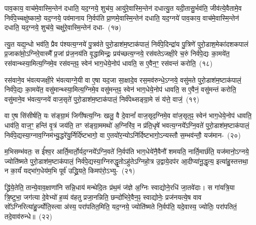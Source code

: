 पाव॒काय॒ वाच॑मे॒वास्मि॒न्तेन॑ दधाति॒ यद॒ग्नये॒ शुच॑य॒ आयु॑रे॒वास्मि॒न्तेन॑ दधात्यु॒त यदी॒तासु॒र्भव॑ति॒ जीव॑त्ये॒वैतामे॒व निर्व॑पे॒च्चक्षु॑ष्कामो॒ यद॒ग्नये॒ पव॑मानाय नि॒र्वप॑ति प्रा॒णमे॒वा\-स्मि॒न्तेन॑ दधाति॒ यद॒ग्नये॑ पाव॒काय॒ वाच॑मे॒वास्मि॒न्तेन॑ दधाति॒ यद॒ग्नये॒ शुच॑ये॒ चक्षु॑रे॒वास्मि॒न्तेन॑ दधा-~(१७)\ip

त्यु॒त यद्य॒न्धो भव॑ति॒ प्रैव प॑श्यत्य॒ग्नये॑ पु॒त्रव॑ते पुरो॒डाश॑\-म॒ष्टा\-क॑पालं॒ निर्व॑पे॒दिन्द्रा॑य पु॒त्रिणे॑ पुरो॒डाश॒मेका॑\-दश\-कपालं प्र॒जाका॑मो़॒\-ऽग्निरे॒वास्मै᳚ प्र॒जां प्र॑ज॒नय॑ति वृ॒द्धामिन्द्रः॒ प्रय॑च्छत्य॒ग्नये॒ रस॑वते\-ऽजक्षी॒रे च॒रुं निर्व॑पे॒द्यः का॒मये॑त॒ रस॑वान्थ्स्या॒मित्य॒ग्निमे॒व रस॑वन्त॒ꣴ॒ स्वेन॑ भाग॒धेये॒नोप॑ धावति॒ स ए॒वैन॒ꣳ॒ रस॑वन्तं करोति॒~(१८)\ip

रस॑वाने॒व भ॑वत्यजक्षी॒रे भ॑वत्याग्ने॒यी वा ए॒षा यद॒जा सा॒क्षादे॒व रस॒मव॑\-रुन्धे॒\-ऽग्नये॒ वसु॑मते पुरो॒डाश॑\-म॒ष्टा\-क॑पालं॒ निर्व॑पे॒द्यः का॒मये॑त॒ वसु॑मान्थ्स्या॒मित्य॒ग्निमे॒व वसु॑मन्त॒ꣴ॒ स्वेन॑ भाग॒धेये॒नोप॑ धावति॒ स ए॒वैनं॒ वसु॑मन्तं करोति॒ वसु॑माने॒व भ॑वत्य॒ग्नये॑ वाज॒सृते॑ पुरो॒डाश॑\-म॒ष्टा\-क॑पालं॒ निर्व॑पेथ्सङ्ग्रा॒मे सं य॑त्ते॒ वाजं॒~(१९)\ip

वा ए॒ष सि॑सीर्\mbox{}षति॒ यः स॑ङ्ग्रा॒मं जिगी॑षत्य॒ग्निः खलु॒ वै दे॒वानां᳚ वाज॒सृद॒ग्निमे॒व वा॑ज॒सृत॒ꣴ॒ स्वेन॑ भाग॒धेये॒नोप॑ धावति॒ धाव॑ति॒ वाज॒ꣳ॒ हन्ति॑ वृ॒त्रं जय॑ति॒ तꣳ स॑ङ्ग्रा॒ममथो॑ अ॒ग्निरि॑व॒ न प्र॑ति॒धृषे॑ भवत्य॒ग्नये᳚\-ऽग्नि॒वते॑ पुरो॒डाश॑\-म॒ष्टा\-क॑पालं॒ निर्व॑पे॒द्यस्या॒ग्नाव॒ग्निम॑भ्यु॒द्धरे॑यु॒र्निर्दि॑ष्टभागो॒ वा ए॒तयो॑र॒न्यो\-ऽनि॑र्दिष्टभागो॒\-ऽन्यस्तौ स॒म्भव॑न्तौ॒ यज॑मान-~(२०)\ip

म॒भिसम्भ॑वतः॒ स ई᳚श्व॒र आर्ति॒मार्तो॒र्यद॒ग्नये᳚\-ऽग्नि॒वते॑ नि॒र्वप॑ति भाग॒धेये॑नै॒वैनौ॑ शमयति॒ नार्ति॒मार्छ॑ति॒ यज॑मानो॒\-ऽग्नये॒ ज्योति॑ष्मते पुरो॒डाश॑\-म॒ष्टा\-क॑पालं॒ निर्व॑पे॒द्यस्या॒ग्निरुद्धृ॒तो\-ऽहु॑ते\-ऽग्निहो॒त्र उ॒द्वाये॒दप॑र आ॒दीप्या॑नू॒द्धृत्य॒ इत्या॑हु॒स्तत्तथा॒ न का॒र्यं॑ यद्भा॑ग॒धेय॑म॒भि पूर्व॑ उद्ध्रि॒यते॒ किमप॑रो॒\-ऽभ्यु-~(२१)\ip

द्ध्रि॑ये॒तेति॒ तान्ये॒वाव॒क्षाणा॑नि सन्नि॒धाय॑ मन्थेदि॒तः प्र॑थ॒मं ज॑ज्ञे अ॒ग्निः स्वाद्योने॒रधि॑ जा॒तवे॑दाः। स गा॑यत्रि॒या त्रि॒ष्टुभा॒ जग॑त्या दे॒वेभ्यो॑ ह॒व्यं व॑हतु प्रजा॒नन्निति॒ छन्दो॑भिरे॒वैन॒ꣴ॒ स्वाद्योनेः॒ प्रज॑नयत्ये॒ष वाव सो᳚\-ऽग्निरित्या॑हु॒र्ज्योति॒स्त्वा अ॑स्य॒ परा॑पतित॒मिति॒ यद॒ग्नये॒ ज्योति॑ष्मते नि॒र्वप॑ति॒ यदे॒वास्य॒ ज्योतिः॒ परा॑पतितं॒ तदे॒\-वाव॑\-रुन्धे॥~(२२)\ip

{\anuvakamend[{क॒रो॒त्य॒न्ना॒दो द॑धाति॒ यद॒ग्नये॒ शुच॑ये॒ चक्षु॑रे॒वास्मि॒न्तेन॑ दधाति करोति॒ वाजं॒ यज॑मान॒मुदे॒वास्य॒ षट्च॑}]}

